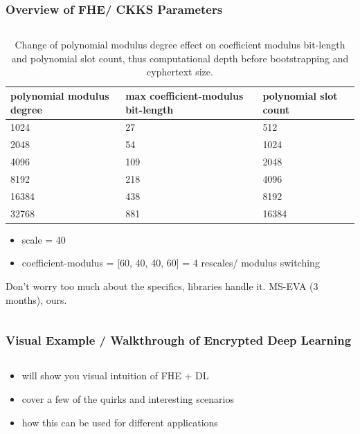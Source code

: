 \documentclass[aspectratio=169]{beamer}
\begin{document}
  \begin{frame}
    \frametitle{Overview of FHE/ CKKS Parameters}
    \begin{columns}
      \begin{column}{1\textwidth}
        \begin{table}
        \centering
        \begin{tabular}{l|l|l}
          polynomial modulus degree & max coefficient-modulus bit-length  & polynomial slot count  \\
          \hline
          1024                      & 27                                  & 512                    \\
          2048                      & 54                                  & 1024                   \\
          4096                      & 109                                 & 2048                   \\
          8192                      & 218                                 & 4096                   \\
          16384                     & 438                                 & 8192                   \\
          32768                     & 881                                 & 16384
        \end{tabular}
        \caption{\label{tab:poly_mod_deg} Change of polynomial modulus degree effect on coefficient modulus bit-length and polynomial slot count, thus computational depth before bootstrapping and cyphertext size.}
        \end{table}
        \begin{itemize}
          \item scale = 40
          \item coefficient-modulus = [60, 40, 40, 60] = 4 rescales/ modulus switching
        \end{itemize}
        Don't worry too much about the specifics, libraries handle it. MS-EVA (3 months), ours.
      \end{column}
    \end{columns}
  \end{frame}

  \begin{frame}
    \frametitle{Visual Example / Walkthrough of Encrypted Deep Learning}
    \begin{columns}
      \begin{column}{1\textwidth}
        \begin{itemize}
            \item will show you visual intuition of FHE + DL
            \item cover a few of the quirks and interesting scenarios
            \item how this can be used for different applications
        \end{itemize}
      \end{column}
    \end{columns}
  \end{frame}
\end{document}
